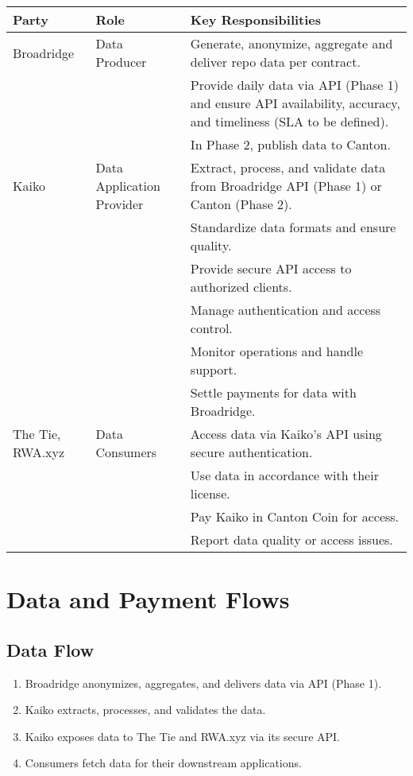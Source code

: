 \documentclass[12pt,a4paper]{article}
\begin{document}
\begin{table}[h!]
\centering
\begin{tabular}{p{} p{} p{}}
\toprule
\textbf{Party} & \textbf{Role} & \textbf{Key Responsibilities} \\
\midrule
Broadridge & Data Producer &
Generate, anonymize, aggregate and deliver repo data per contract.\\
& & Provide daily data via API (Phase 1) and ensure API availability, accuracy, and timeliness (SLA to be defined).\\
& & In Phase 2, publish data to Canton.\\
\addlinespace
Kaiko & Data Application Provider &
Extract, process, and validate data from Broadridge API (Phase 1) or Canton (Phase 2).\\
& & Standardize data formats and ensure quality.\\
& & Provide secure API access to authorized clients.\\
& & Manage authentication and access control.\\
& & Monitor operations and handle support.\\
& & Settle payments for data with Broadridge.\\
\addlinespace
The Tie, RWA.xyz & Data Consumers &
Access data via Kaiko's API using secure authentication.\\
& & Use data in accordance with their license.\\
& & Pay Kaiko in Canton Coin for access.\\
& & Report data quality or access issues.\\
\bottomrule
\end{tabular}
\end{table}

\section{Data and Payment Flows}

\subsection*{Data Flow}
\begin{enumerate}
    \item Broadridge anonymizes, aggregates, and delivers data via API (Phase 1).
    \item Kaiko extracts, processes, and validates the data.
    \item Kaiko exposes data to The Tie and RWA.xyz via its secure API.
    \item Consumers fetch data for their downstream applications.
\end{enumerate}
\end{document}
